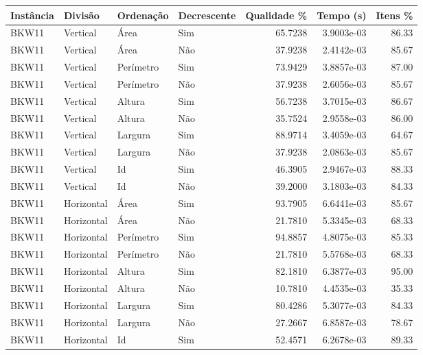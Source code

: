 \begin{tabular}{llllrrr}
\hline
Instância & Divisão     & Ordenação & Decrescente & Qualidade \% & Tempo (s)  & Itens \% \\
\hline
BKW11     & Vertical    & Área      & Sim         & 65.7238      & 3.9003e-03 & 86.33    \\
BKW11     & Vertical    & Área      & Não         & 37.9238      & 2.4142e-03 & 85.67    \\
BKW11     & Vertical    & Perímetro & Sim         & 73.9429      & 3.8857e-03 & 87.00    \\
BKW11     & Vertical    & Perímetro & Não         & 37.9238      & 2.6056e-03 & 85.67    \\
BKW11     & Vertical    & Altura    & Sim         & 56.7238      & 3.7015e-03 & 86.67    \\
BKW11     & Vertical    & Altura    & Não         & 35.7524      & 2.9558e-03 & 86.00    \\
BKW11     & Vertical    & Largura   & Sim         & 88.9714      & 3.4059e-03 & 64.67    \\
BKW11     & Vertical    & Largura   & Não         & 37.9238      & 2.0863e-03 & 85.67    \\
BKW11     & Vertical    & Id        & Sim         & 46.3905      & 2.9467e-03 & 88.33    \\
BKW11     & Vertical    & Id        & Não         & 39.2000      & 3.1803e-03 & 84.33    \\
BKW11     & Horizontal  & Área      & Sim         & 93.7905      & 6.6441e-03 & 85.67    \\
BKW11     & Horizontal  & Área      & Não         & 21.7810      & 5.3345e-03 & 68.33    \\
BKW11     & Horizontal  & Perímetro & Sim         & 94.8857      & 4.8075e-03 & 85.33    \\
BKW11     & Horizontal  & Perímetro & Não         & 21.7810      & 5.5768e-03 & 68.33    \\
BKW11     & Horizontal  & Altura    & Sim         & 82.1810      & 6.3877e-03 & 95.00    \\
BKW11     & Horizontal  & Altura    & Não         & 10.7810      & 4.4535e-03 & 35.33    \\
BKW11     & Horizontal  & Largura   & Sim         & 80.4286      & 5.3077e-03 & 84.33    \\
BKW11     & Horizontal  & Largura   & Não         & 27.2667      & 6.8587e-03 & 78.67    \\
BKW11     & Horizontal  & Id        & Sim         & 52.4571      & 6.2678e-03 & 89.33    \\

\end{tabular}
